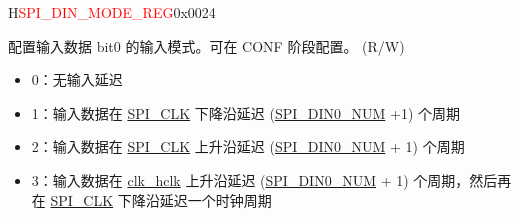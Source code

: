 \begin{register}{H}{\textcolor{red}{SPI\_DIN\_MODE\_REG}}{0x{}0024}\label{regdesc:SPIDINMODEREG}
%
%
%
%
%
%
%
%
%
%
\regnewline%
\begin{regdesc}\begin{reglist}
\label{fielddesc:SPIDIN0MODE}\item [SPI\_DIN0\_MODE] 配置输入数据 bit0 的输入模式。可在 CONF 阶段配置。 (R/W)
\begin{itemize}
    \item 0：无输入延迟
    \item 1：输入数据在 \hyperref[clk:SPICLK]{SPI\_CLK} 下降沿延迟 (\hyperref[fielddesc:SPIDIN0NUM]{SPI\_DIN0\_NUM} +1) 个周期
    \item 2：输入数据在 \hyperref[clk:SPICLK]{SPI\_CLK} 上升沿延迟 (\hyperref[fielddesc:SPIDIN0NUM]{SPI\_DIN0\_NUM} + 1) 个周期
    \item 3：输入数据在 \hyperref[clk:clkhclk]{clk\_hclk} 上升沿延迟 (\hyperref[fielddesc:SPIDIN0NUM]{SPI\_DIN0\_NUM} + 1) 个周期，然后再在 \hyperref[clk:SPICLK]{SPI\_CLK} 下降沿延迟一个时钟周期
\end{itemize}


\end{reglist}
\end{regdesc}
\end{register}
